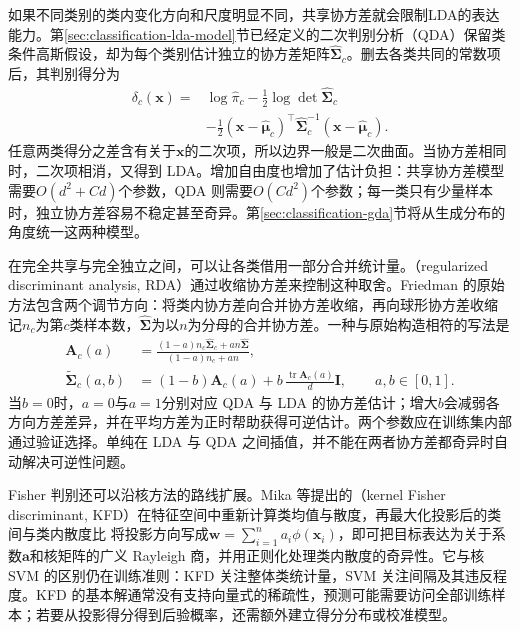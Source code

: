 如果不同类别的类内变化方向和尺度明显不同，共享协方差就会限制LDA的表达能力。第\ref{sec:classification-lda-model}节已经定义的二次判别分析（QDA）保留类条件高斯假设，却为每个类别估计独立的协方差矩阵$\hat{\bm{\Sigma}}_c$。删去各类共同的常数项后，其判别得分为
\begin{equation}
  \begin{aligned}
    \delta_c(\bm{x})
      ={}&\log\hat{\pi}_c-\frac12\log\det\hat{\bm{\Sigma}}_c\\
        &-\frac12(\bm{x}-\hat{\bm{\mu}}_c)^\top
          \hat{\bm{\Sigma}}_c^{-1}(\bm{x}-\hat{\bm{\mu}}_c).
  \end{aligned}
  \label{eq:classification-qda-score}
\end{equation}
任意两类得分之差含有关于$\bm{x}$的二次项，所以边界一般是二次曲面。当协方差相同时，二次项相消，又得到 LDA。增加自由度也增加了估计负担：共享协方差模型需要$O(d^2+Cd)$个参数，QDA 则需要$O(Cd^2)$个参数；每一类只有少量样本时，独立协方差容易不稳定甚至奇异。第\ref{sec:classification-gda}节将从生成分布的角度统一这两种模型。

在完全共享与完全独立之间，可以让各类借用一部分合并统计量。（regularized discriminant analysis, RDA）通过收缩协方差来控制这种取舍。Friedman 的原始方法包含两个调节方向：将类内协方差向合并协方差收缩，再向球形协方差收缩
记$n_c$为第$c$类样本数，$\hat{\bm{\Sigma}}$为以$n$为分母的合并协方差。一种与原始构造相符的写法是
\begin{equation}
  \begin{aligned}
    \bm{A}_c(a)
      &=\frac{(1-a)n_c\hat{\bm{\Sigma}}_c+an\hat{\bm{\Sigma}}}
              {(1-a)n_c+an},\\
    \tilde{\bm{\Sigma}}_c(a,b)
      &=(1-b)\bm{A}_c(a)
        +b\,\frac{\operatorname{tr}\bm{A}_c(a)}{d}\bm{I},
        \qquad a,b\in[0,1].
  \end{aligned}
  \label{eq:classification-rda}
\end{equation}
当$b=0$时，$a=0$与$a=1$分别对应 QDA 与 LDA 的协方差估计；增大$b$会减弱各方向方差差异，并在平均方差为正时帮助获得可逆估计。两个参数应在训练集内部通过验证选择。单纯在 LDA 与 QDA 之间插值，并不能在两者协方差都奇异时自动解决可逆性问题。

Fisher 判别还可以沿核方法的路线扩展。Mika 等提出的（kernel Fisher discriminant, KFD）在特征空间中重新计算类均值与散度，再最大化投影后的类间与类内散度比
将投影方向写成$\bm{w}=\sum_{i=1}^n a_i\phi(\bm{x}_i)$，即可把目标表达为关于系数$\bm{a}$和核矩阵的广义 Rayleigh 商，并用正则化处理类内散度的奇异性。它与核 SVM 的区别仍在训练准则：KFD 关注整体类统计量，SVM 关注间隔及其违反程度。KFD 的基本解通常没有支持向量式的稀疏性，预测可能需要访问全部训练样本；若要从投影得分得到后验概率，还需额外建立得分分布或校准模型。

